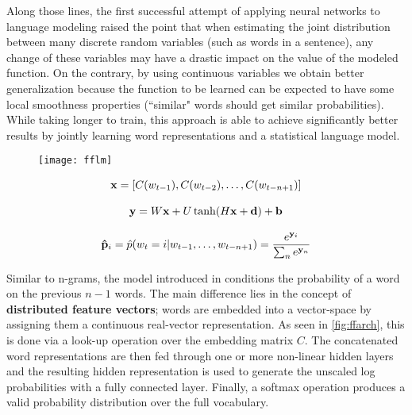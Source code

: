 Along those lines, the first successful attempt of applying neural networks to language modeling \cite{bengio2003neural} raised the point that when estimating the joint distribution between many discrete random variables (such as words in a sentence), any change of these variables may have a drastic impact on the value of the modeled function. On the contrary, by using continuous variables we obtain better generalization because the function to be learned can be expected to have some local smoothness properties (``similar" words should get similar probabilities). While taking longer to train, this approach is able to achieve significantly better results by jointly learning word representations and a statistical language model.

\begin{figure}[H]
	\noindent\begin{minipage}{.4\linewidth}
		\centering
		\texttt{[image: fflm]}
		\label{fig:ffarch}
	\end{minipage}
	\hspace{0.25cm}
	\begin{minipage}{.7\linewidth}	
		\begin{equation} \label{eq:fwnlm}
		\openup 2ex
		\begin{gathered}
		\mathbf{x} = [C(w_{t-1}),C(w_{t-2}),\ldots,C(w_{t-n+1})] \\
		\mathbf{y} = W\mathbf{x} + U \tanh(H\mathbf{x}+\mathbf{d}) + \mathbf{b} \\
		\mathbf{\hat{p}}_i=\hat{p}(w_t=i|w_{t-1},\ldots,w_{t-n+1}) = \frac{e^{\mathbf{y}_i}}{\sum_{n}e^{\mathbf{y}_n}} \\
		\end{gathered}
		\end{equation}
	\end{minipage}
\end{figure}

Similar to n-grams, the model introduced in \cite{bengio2003neural} conditions the probability of a word on the previous $n-1$ words. The main difference lies in the concept of \textbf{distributed feature vectors}; words are embedded into a vector-space by assigning them a continuous real-vector representation. As seen in \autoref{fig:ffarch}, this is done via a look-up operation over the embedding matrix $C$. The concatenated word representations are then fed through one or more non-linear hidden layers and the resulting hidden representation is used to generate the unscaled log probabilities with a fully connected layer. Finally, a softmax operation produces a valid probability distribution over the full vocabulary.

